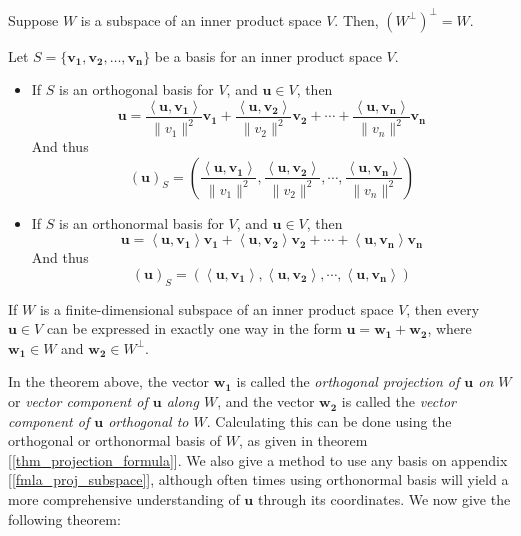 \documentclass{report}
\begin{document}
		\begin{thm}
			Suppose $W$ is a subspace of an inner product space $V$. Then, $(W^\perp)^\perp=W$.
		\end{thm}
		
		\begin{thm}\label{thm_projection_formula}
			Let $S=\{\bm{v_1},\bm{v_2},\dots,\bm{v_n}\}$ be a basis for an inner product space $V$.
			\begin{itemize}
					\item If $S$ is an orthogonal basis for $V$, and $\bm{u} \in V$, then
					\begin{displaymath}
						\bm{u}=\frac{\left< \bm{u}, \bm{v_1} \right>}{\|v_1\|^2}\bm{v_1}+
						       \frac{\left< \bm{u}, \bm{v_2} \right>}{\|v_2\|^2}\bm{v_2}+\cdots+
						       \frac{\left< \bm{u}, \bm{v_n} \right>}{\|v_n\|^2}\bm{v_n}
					\end{displaymath}
					And thus
					\begin{displaymath}
						(\bm{u})_S=\left(\frac{\left< \bm{u}, \bm{v_1} \right>}{\|v_1\|^2},
						\frac{\left< \bm{u}, \bm{v_2} \right>}{\|v_2\|^2},\cdots,
						\frac{\left< \bm{u}, \bm{v_n} \right>}{\|v_n\|^2}\right)
					\end{displaymath}
					\item If $S$ is an orthonormal basis for $V$, and $\bm{u} \in V$, then
					\begin{displaymath}
						\bm{u}=\left< \bm{u}, \bm{v_1} \right>\bm{v_1}+
						       \left< \bm{u}, \bm{v_2} \right>\bm{v_2}+\cdots+
						       \left< \bm{u}, \bm{v_n} \right>\bm{v_n}
					\end{displaymath}
					And thus
					\begin{displaymath}
						(\bm{u})_S=\left(\left< \bm{u}, \bm{v_1} \right>,
						\left< \bm{u}, \bm{v_2} \right>,\cdots,
						\left< \bm{u}, \bm{v_n} \right>\right)
					\end{displaymath}
			\end{itemize}
		\end{thm}

		
		\begin{thm}
			If $W$ is a finite-dimensional subspace of an inner product space $V$, then every $\bm{u} \in V$ can be expressed in exactly one way in the form $\bm{u}=\bm{w_1}+\bm{w_2}$, where $\bm{w_1} \in W$ and $\bm{w_2} \in W^\perp$.
		\end{thm}
		
		In the theorem above, the vector $\bm{w_1}$ is called the \emph{orthogonal projection of $\bm{u}$ on $W$} or \emph{vector component of $\bm{u}$ along $W$}, and the vector $\bm{w_2}$ is called the \emph{vector component of $\bm{u}$ orthogonal to $W$}. Calculating this can be done using the orthogonal or orthonormal basis of $W$, as given in theorem [\ref{thm_projection_formula}]. We also give a method to use any basis on appendix [\ref{fmla_proj_subspace}], although often times using orthonormal basis will yield a more comprehensive understanding of $\bm{u}$ through its coordinates. We now give the following theorem:
		
\end{document}
